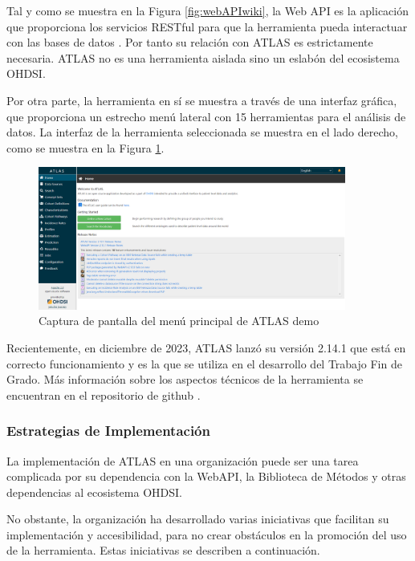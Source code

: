 Tal y como se muestra en la Figura \ref{fig:webAPIwiki}, la Web API es la aplicación que proporciona los servicios RESTful para que la herramienta pueda interactuar con las bases de datos \cite{githubWebAPIwiki}. Por tanto su relación con ATLAS es estrictamente necesaria. ATLAS no es una herramienta aislada sino un eslabón del ecosistema OHDSI.

Por otra parte, la herramienta en sí se muestra a través de una interfaz gráfica, que proporciona un estrecho menú lateral con 15 herramientas para el análisis de datos. La interfaz de la herramienta seleccionada se muestra en el lado derecho, como se muestra en la Figura \ref{fig:ATLASdemoHome}.

\begin{figure}[H]
\centering
\includegraphics[width=0.90\textwidth]{figures/ATLASdemoHome.png}
     \caption{Captura de pantalla del menú principal de ATLAS demo}
    \label{fig:ATLASdemoHome}
\end{figure}

Recientemente, en diciembre de 2023, ATLAS lanzó su versión 2.14.1 que está en correcto funcionamiento y es la que se utiliza en el desarrollo del Trabajo Fin de Grado. Más información sobre los aspectos técnicos de la herramienta se encuentran en el repositorio de github \cite{githubATLAS}.

\subsubsection{Estrategias de Implementación}

La implementación de ATLAS en una organización puede ser una tarea complicada por su dependencia con la WebAPI, la Biblioteca de Métodos y otras dependencias al ecosistema OHDSI. 

No obstante, la organización ha desarrollado varias iniciativas que facilitan su implementación y accesibilidad, para no crear obstáculos en la promoción del uso de la herramienta. Estas iniciativas se describen a continuación.

